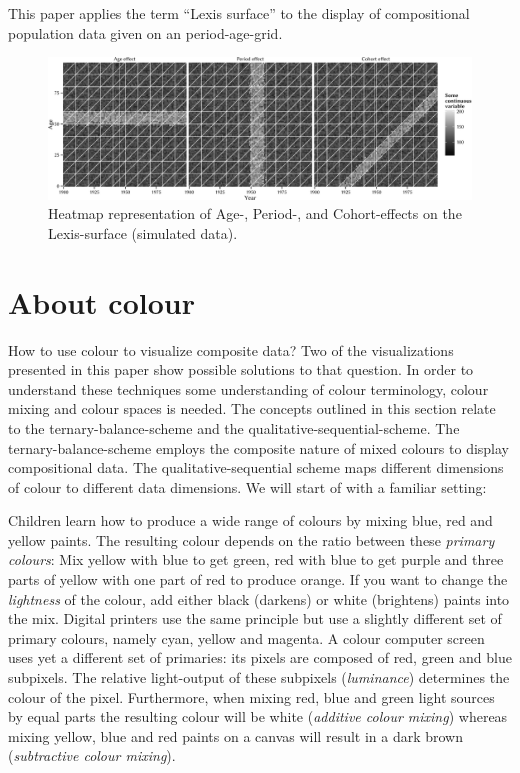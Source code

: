 \documentclass[a4paper]{scrartcl}
\begin{document}
This paper applies the term \enquote{Lexis surface} to the display of compositional population data given on an period-age-grid.

\begin{figure}[htb!]
  \centering
  \includegraphics[width = \linewidth]{../fig/plot-lexis_fx.pdf}
  \caption{Heatmap representation of Age-, Period-, and Cohort-effects on the Lexis-surface (simulated data).}
  \label{fig:lexis_fx}
\end{figure}

\section*{About colour}

How to use colour to visualize composite data? Two of the visualizations presented in this paper show possible solutions to that question. In order to understand these techniques some understanding of colour terminology, colour mixing and colour spaces is needed. The concepts outlined in this section relate to the ternary-balance-scheme and the qualitative-sequential-scheme. The ternary-balance-scheme employs the composite nature of mixed colours to display compositional data. The qualitative-sequential scheme maps different dimensions of colour to different data dimensions. We will start of with a familiar setting:

Children learn how to produce a wide range of colours by mixing blue, red and yellow paints. The resulting colour depends on the ratio between these \emph{primary colours}: Mix yellow with blue to get green, red with blue to get purple and three parts of yellow with one part of red to produce orange. If you want to change the \emph{lightness} of the colour, add either black (darkens) or white (brightens) paints into the mix. Digital printers use the same principle but use a slightly different set of primary colours, namely cyan, yellow and magenta. A colour computer screen uses yet a different set of primaries: its pixels are composed of red, green and blue subpixels. The relative light-output of these subpixels (\emph{luminance}) determines the colour of the pixel. Furthermore, when mixing red, blue and green light sources by equal parts the resulting colour will be white (\emph{additive colour mixing}) whereas mixing yellow, blue and red paints on a canvas will result in a dark brown (\emph{subtractive colour mixing}).
\end{document}
